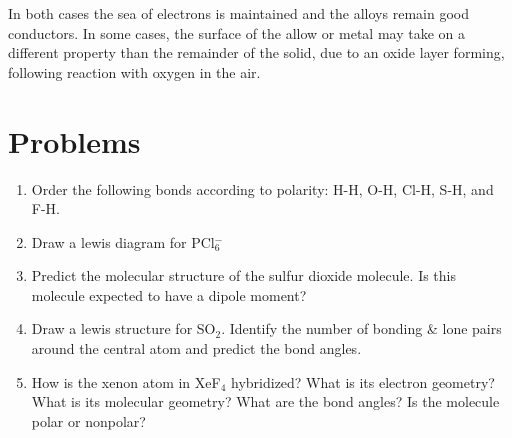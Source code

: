 \documentclass[../chem.tex]{subfiles}
\begin{document}
In both cases the sea of electrons is maintained and the alloys remain good conductors. In some cases, the surface of the allow or metal 
may take on a different property than the remainder of the solid, due to an oxide layer forming, following reaction with oxygen in the air.

\section*{Problems}
\begin{enumerate}
    \item Order the following bonds according to polarity: H-H, O-H, Cl-H, S-H, and F-H.
    \item Draw a lewis diagram for PCl$_6^-$
    \item Predict the molecular structure of the sulfur dioxide molecule. Is this molecule expected to have a dipole moment?
    \item Draw a lewis structure for SO$_2$. Identify the number of bonding \& lone pairs around the central atom and predict the bond angles.
    \item How is the xenon atom in XeF$_4$ hybridized? What is its electron geometry? What is its molecular geometry? What are the bond angles? Is the molecule polar or nonpolar?
\end{enumerate}
\end{document}
